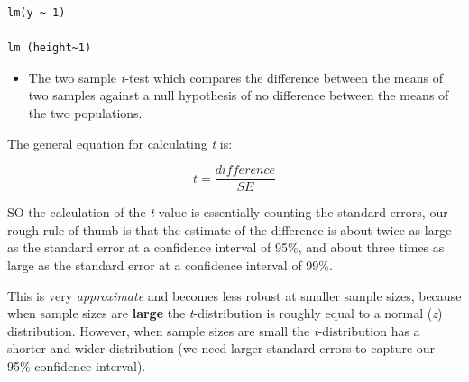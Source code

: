 \documentclass[
]{book}
\providecommand{\tightlist}{%
  \setlength{\itemsep}{0pt}\setlength{\parskip}{0pt}}
\begin{document}
\begin{verbatim}
lm(y ~ 1)

lm (height~1)
\end{verbatim}

\begin{itemize}
\tightlist
\item
  The two sample \emph{t}-test which compares the difference between the means of two samples against a null hypothesis of no difference between the means of the two populations.
\end{itemize}

The general equation for calculating \emph{t} is:

\[
t = \frac{difference}{SE}
\]

SO the calculation of the \emph{t}-value is essentially counting the standard errors, our rough rule of thumb is that the estimate of the difference is about twice as large as the standard error at a confidence interval of 95\%, and about three times as large as the standard error at a confidence interval of 99\%.

This is very \emph{approximate} and becomes less robust at smaller sample sizes, because when sample sizes are \textbf{large} the \emph{t}-distribution is roughly equal to a normal (\emph{z}) distribution. However, when sample sizes are small the \emph{t}-distribution has a shorter and wider distribution (we need larger standard errors to capture our 95\% confidence interval).
\end{document}

